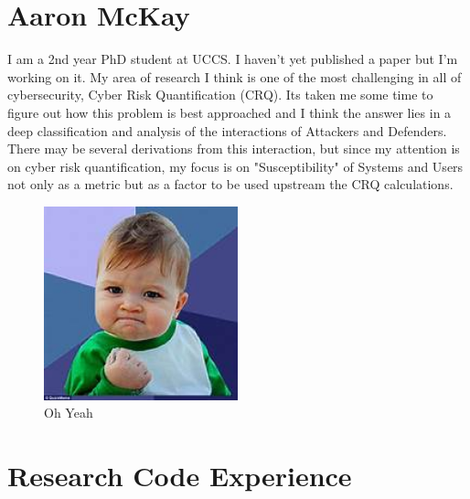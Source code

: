 
% 


\section{Aaron McKay}
I am a 2nd year PhD student at UCCS.  I haven't yet published a paper but I'm working on it.  My area of research I think is one of the most challenging in all of cybersecurity, Cyber Risk Quantification (CRQ).  Its taken me some time to figure out how this problem is best approached and I think the answer lies in a deep classification and analysis of the interactions of Attackers and Defenders. There may be several derivations from this interaction, but since my attention is on cyber risk quantification, my focus is on "Susceptibility" of Systems and Users not only as a metric but as a factor to be used upstream the CRQ calculations.

\begin{figure}[h]
    \centering
    \includegraphics[width=0.5\textwidth]{images/Oh_Yeah.jpg}
    \caption{Oh Yeah}
    \label{fig:oh-yeah}
\end{figure}

\section{Research Code Experience}
